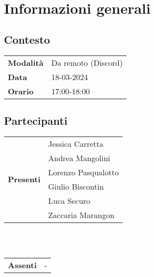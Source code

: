 \section{Informazioni generali} \label{sec:info_generali}
    \subsection{Contesto}
        \begin{tabular}{ p{2.2cm} | l }
            \textbf{Modalità} & Da remoto (Discord)\\  %
            \textbf{Data} & 18-03-2024\\    %
            \textbf{Orario} & 17:00-18:00   %
        \end{tabular}

        \subsection{Partecipanti}

        \begin{tabular}{ p{2.2cm} | l }   %
            \multirow{6}{*}{\textbf{Presenti}} 
                & Jessica Carretta \\
                & Andrea Mangolini \\
                & Lorenzo Pasqualotto \\
                & Giulio Biscontin \\
                & Luca Securo \\
                & Zaccaria Marangon
        \end{tabular} 
        \\
        \vspace*{0.2cm}
        \\
        \begin{tabular}{ p{2.2cm} | l }   %
            \multirow{1}{*}{\textbf{Assenti}} & - 
        \end{tabular}